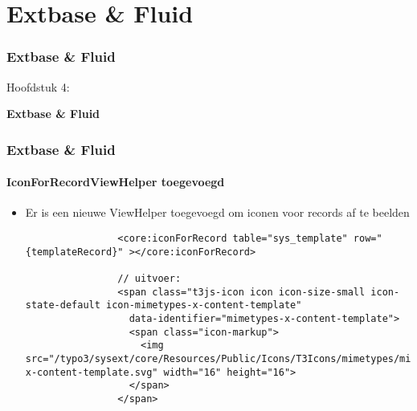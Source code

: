 %

\section{Extbase \& Fluid}
\begin{frame}[fragile]
	\frametitle{Extbase \& Fluid}

	\begin{center}\huge{Hoofdstuk 4:}\end{center}
	\begin{center}\huge{\color{typo3darkgrey}\textbf{Extbase \& Fluid}}\end{center}

\end{frame}

\begin{frame}[fragile]
	\frametitle{Extbase \& Fluid}
	\framesubtitle{IconForRecordViewHelper toegevoegd}

	\lstset{basicstyle=\tiny\ttfamily}

	\begin{itemize}

		\item Er is een nieuwe ViewHelper toegevoegd om iconen voor records af te beelden

			\begin{lstlisting}
				<core:iconForRecord table="sys_template" row="{templateRecord}" ></core:iconForRecord>

				// uitvoer:
				<span class="t3js-icon icon icon-size-small icon-state-default icon-mimetypes-x-content-template"
				  data-identifier="mimetypes-x-content-template">
				  <span class="icon-markup">
				    <img src="/typo3/sysext/core/Resources/Public/Icons/T3Icons/mimetypes/mimetypes-x-content-template.svg" width="16" height="16">
				  </span>
				</span>
			\end{lstlisting}

	\end{itemize}

\end{frame}

